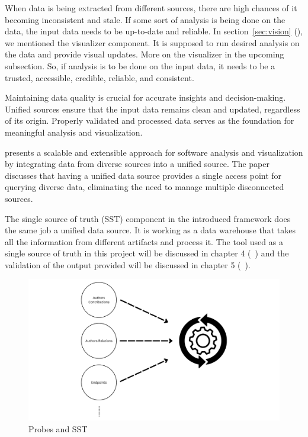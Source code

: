 When data is being extracted from different sources, there are high chances of it becoming inconsistent and stale. If some sort of analysis is being done on the data, the input data needs to be up-to-date and reliable. In section~\ref{sec:vision} (), we mentioned the visualizer component. It is supposed to run desired analysis on the data and provide visual updates. More on the visualizer in the upcoming subsection. So, if analysis is to be done on the input data, it needs to be a trusted, accessible, credible, reliable, and consistent.

Maintaining data quality is crucial for accurate insights and decision-making. Unified sources ensure that the input data remains clean and updated, regardless of its origin. Properly validated and processed data serves as the foundation for meaningful analysis and visualization.

\citep{MullerUdsforSA2018} presents a scalable and extensible approach for software analysis and visualization by integrating data from diverse sources into a unified source. The paper discusses that having a unified data source provides a single access point for querying diverse data, eliminating the need to manage multiple disconnected sources. 

The single source of truth (SST) component in the introduced framework does the same job a unified data source. It is working as a data warehouse that takes all the information from different artifacts and process it. The tool used as a single source of truth in this project will be discussed in chapter 4 (~) and the validation of the output provided will be discussed in chapter 5 (~).

\begin{figure}[ht]
    \centering
    \includegraphics[width=1\textwidth]{figures/sst_working.png}
    \caption[Probes and SST]{Probes and SST}
    \label{fig_probes_sst}
\end{figure}

